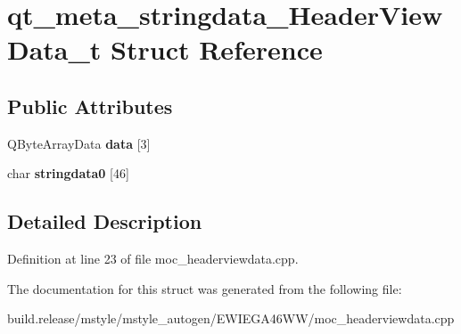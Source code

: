 \hypertarget{structqt__meta__stringdata___header_view_data__t}{}\section{qt\+\_\+meta\+\_\+stringdata\+\_\+\+Header\+View\+Data\+\_\+t Struct Reference}
\label{structqt__meta__stringdata___header_view_data__t}
\subsection*{Public Attributes}
\begin{DoxyCompactItemize}
\item 
\mbox{\label{structqt__meta__stringdata___header_view_data__t_aac85866926928dc265c9da8728ecd7bf}} 
Q\+Byte\+Array\+Data {\bfseries data} \mbox{[}3\mbox{]}
\item 
\mbox{\label{structqt__meta__stringdata___header_view_data__t_a57f209dd1e5ff4f349941ed7582fbbdd}} 
char {\bfseries stringdata0} \mbox{[}46\mbox{]}
\end{DoxyCompactItemize}


\subsection{Detailed Description}


Definition at line 23 of file moc\+\_\+headerviewdata.\+cpp.



The documentation for this struct was generated from the following file\+:\begin{DoxyCompactItemize}
\item 
build.\+release/mstyle/mstyle\+\_\+autogen/\+E\+W\+I\+E\+G\+A46\+W\+W/moc\+\_\+headerviewdata.\+cpp\end{DoxyCompactItemize}
